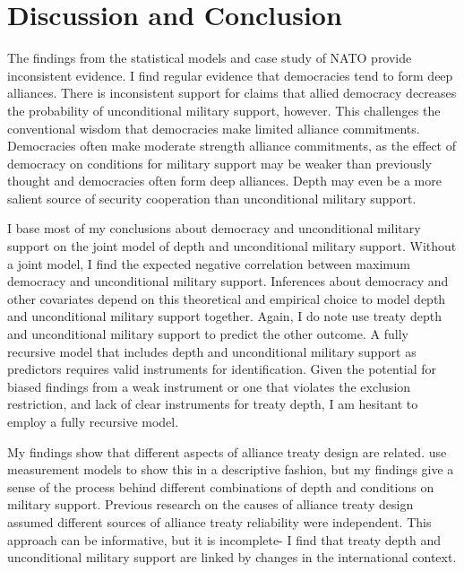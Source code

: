 \documentclass[12pt]{article}
\begin{document}
\section{Discussion and Conclusion}


The findings from the statistical models and case study of NATO provide inconsistent evidence. 
I find regular evidence that democracies tend to form deep alliances.
There is inconsistent support for claims that allied democracy decreases the probability of unconditional military support, however. 
This challenges the conventional wisdom that democracies make limited alliance commitments.
Democracies often make moderate strength alliance commitments, as the effect of democracy on conditions for military support may be weaker than previously thought and democracies often form deep alliances.  
Depth may even be a more salient source of security cooperation than unconditional military support. 


I base most of my conclusions about democracy and unconditional military support on the joint model of depth and unconditional military support.
Without a joint model, I find the expected negative correlation between maximum democracy and unconditional military support.  
Inferences about democracy and other covariates depend on this theoretical and empirical choice to model depth and unconditional military support together. 
Again, I do note use treaty depth and unconditional military support to predict the other outcome. 
A fully recursive model that includes depth and unconditional military support as predictors requires valid instruments for identification.
Given the potential for biased findings from a weak instrument or one that violates the exclusion restriction, and lack of clear instruments for treaty depth, I am hesitant to employ a fully recursive model.  


My findings show that different aspects of alliance treaty design are related. 
\citet{BensonClinton2016} use measurement models to show this in a descriptive fashion, but my findings give a sense of the process behind different combinations of depth and conditions on military support. 
Previous research on the causes of alliance treaty design \citep{Benson2012, Mattes2012, Chibaetal2015} assumed different sources of alliance treaty reliability were independent. 
This approach can be informative, but it is incomplete- I find that treaty depth and unconditional military support are linked by changes in the international context. 
\end{document}
